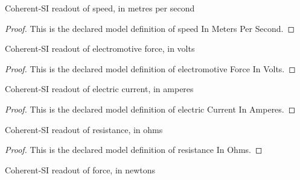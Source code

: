 \begin{definition}
  \label{def:physics:phyx-mini-0937:phyxminiproblems-problemphyxmini0937-speedinmeterspersecond}
  Coherent-SI readout of speed, in metres per second
\end{definition}
\begin{proof}
  This is the declared model definition of speed In Meters Per Second.
\end{proof}
\begin{definition}
  \label{def:physics:phyx-mini-0937:phyxminiproblems-problemphyxmini0937-electromotiveforceinvolts}
  Coherent-SI readout of electromotive force, in volts
\end{definition}
\begin{proof}
  This is the declared model definition of electromotive Force In Volts.
\end{proof}
\begin{definition}
  \label{def:physics:phyx-mini-0937:phyxminiproblems-problemphyxmini0937-electriccurrentinamperes}
  Coherent-SI readout of electric current, in amperes
\end{definition}
\begin{proof}
  This is the declared model definition of electric Current In Amperes.
\end{proof}
\begin{definition}
  \label{def:physics:phyx-mini-0937:phyxminiproblems-problemphyxmini0937-resistanceinohms}
  Coherent-SI readout of resistance, in ohms
\end{definition}
\begin{proof}
  This is the declared model definition of resistance In Ohms.
\end{proof}
\begin{definition}
  \label{def:physics:phyx-mini-0937:phyxminiproblems-problemphyxmini0937-forceinnewtons}
  Coherent-SI readout of force, in newtons
\end{definition}
